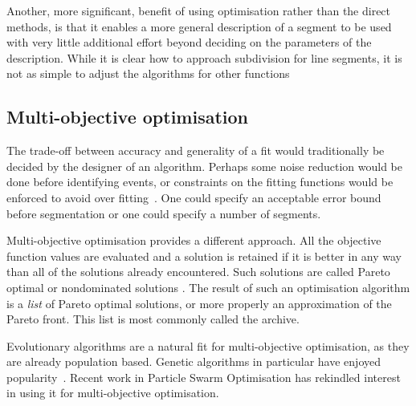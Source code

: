 Another, more significant, benefit of using optimisation rather than
the direct methods, is that it enables a more general description of a
segment to be used with very little additional effort beyond deciding
on the parameters of the description.  While it is clear how to
approach subdivision for line segments, it is not as simple to adjust
the algorithms for other functions~\citep{waibel_readings_1990}

\subsection{Multi-objective optimisation}
\label{sec:multi-object-optim}
The trade-off between accuracy and generality of a fit would
traditionally be decided by the designer of an algorithm.  Perhaps
some noise reduction would be done before identifying events, or
constraints on the fitting functions would be enforced to avoid over
fitting~\citep{arora_fitting_2003,punskaya_bayesian_2002}.  One could
specify an acceptable error bound before segmentation or one could
specify a number of segments.

Multi-objective optimisation provides a different approach.  All the
objective function values are evaluated and a solution is retained if
it is better in any way than all of the solutions already encountered.
Such solutions are called Pareto optimal or nondominated
solutions \citep{steuer_multiple_1986}. The result of such an optimisation
algorithm is a \emph{list} of Pareto optimal solutions, or more
properly an approximation of the Pareto front.  This list is most
commonly called the archive.

Evolutionary algorithms are a natural fit for multi-objective
optimisation, as they are already population based.  Genetic
algorithms in particular have enjoyed
popularity~\citep{deb_multi-objective_2001}.  Recent work in Particle
Swarm Optimisation has rekindled interest in using it for
multi-objective optimisation.


